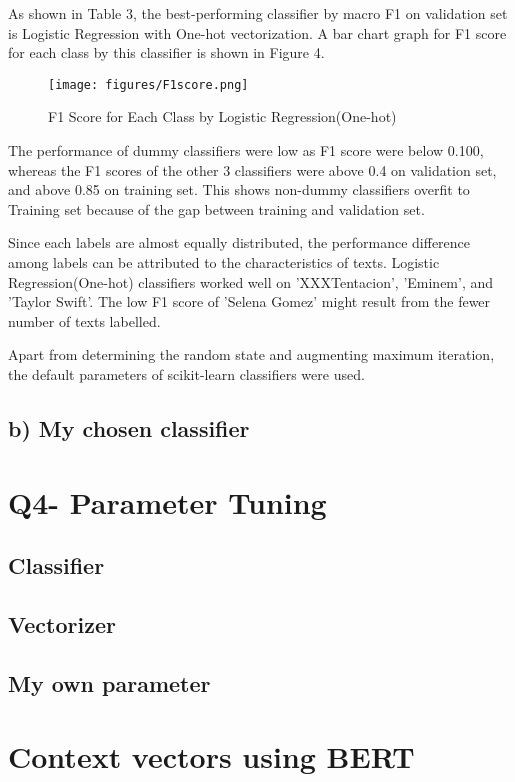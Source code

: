 \documentclass[a4paper,11pt]{article}
\begin{document}
As shown in Table 3, the best-performing classifier by macro F1 on validation set is Logistic Regression with One-hot vectorization.
A bar chart graph for F1 score for each class by this classifier is shown in Figure 4.
\begin{figure}[htbp]
  \begin{center}
  \texttt{[image: figures/F1score.png]}
  \caption{F1 Score for Each Class by Logistic Regression(One-hot)}
  \end{center}
\end{figure}

The performance of dummy classifiers were low as F1 score were below 0.100,
whereas the F1 scores of the other 3 classifiers were above 0.4 on validation set,
and above 0.85 on training set.
This shows non-dummy classifiers overfit to Training set because of the gap between training and validation set.

Since each labels are almost equally distributed, the performance difference among labels can be attributed to the characteristics of texts.
Logistic Regression(One-hot) classifiers worked well on 'XXXTentacion', 'Eminem', and 'Taylor Swift'.
The low F1 score of 'Selena Gomez' might result from the fewer number of texts labelled.

Apart from determining the random state and augmenting maximum iteration, the default parameters of scikit-learn classifiers were used.


\subsection{b) My chosen classifier}


\section{Q4- Parameter Tuning}
\subsection{Classifier}
\subsection{Vectorizer}
\subsection{My own parameter}


\section{Context vectors using BERT}
\end{document}
